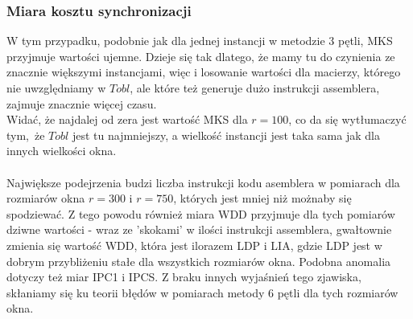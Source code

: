 \documentclass[10pt,a4paper]{article}
\begin{document}
\subsubsection*{Miara kosztu synchronizacji}
W tym przypadku, podobnie jak dla jednej instancji w metodzie 3 pętli, MKS przyjmuje
wartości ujemne. Dzieje się tak dlatego, że mamy tu do czynienia ze znacznie większymi instancjami,
więc i losowanie wartości dla macierzy, którego nie uwzględniamy w $Tobl$, ale które też
generuje dużo instrukcji assemblera, zajmuje znacznie więcej czasu.\\
Widać, że najdalej od zera jest wartość MKS dla $r=100$, co da się wytłumaczyć tym, że
$Tobl$ jest tu najmniejszy, a wielkość instancji jest taka sama jak dla innych wielkości
okna.\\
\\
Największe podejrzenia budzi liczba instrukcji kodu asemblera w pomiarach dla rozmiarów okna $r=300$ i
$r=750$, których jest mniej niż możnaby się spodziewać. Z tego powodu również miara WDD przyjmuje dla 
tych pomiarów dziwne wartości - wraz ze 'skokami' w ilości instrukcji assemblera, gwałtownie zmienia
się wartość WDD, która jest ilorazem LDP i LIA, gdzie LDP jest w dobrym przybliżeniu stałe 
dla wszystkich rozmiarów okna. Podobna anomalia dotyczy też miar IPC1 i IPCS. 
Z braku innych wyjaśnień tego zjawiska, skłaniamy się ku teorii błędów w pomiarach metody 6 pętli dla tych rozmiarów okna.
\end{document}
